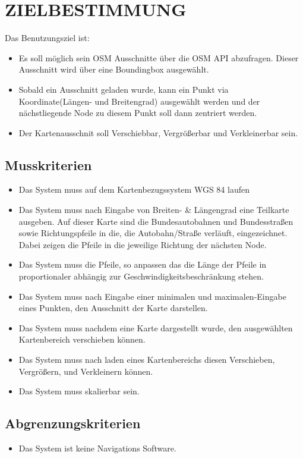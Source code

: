 \newpage
	\section{\Large ZIELBESTIMMUNG}
	Das Benutzungsziel ist:
	\begin{itemize}
		\item Es soll möglich sein OSM Ausschnitte über die OSM API abzufragen. Dieser Ausschnitt wird über eine Boundingbox ausgewählt.
		\item Sobald ein Ausschnitt geladen wurde, kann ein Punkt via Koordinate(Längen- und Breitengrad) ausgewählt werden und der nächstliegende Node zu diesem Punkt soll dann zentriert werden.
		\item Der Kartenausschnit soll Verschiebbar, Vergrößerbar und Verkleinerbar sein.
	\end{itemize}
	\subsection{Musskriterien}
	\begin{itemize}
		\item Das System muss auf dem Kartenbezugssystem WGS 84 laufen
		\item Das System muss nach Eingabe von Breiten- \& Längengrad eine Teilkarte ausgeben. Auf dieser Karte sind die Bundesautobahnen und Bundesstraßen sowie Richtungspfeile in die, die Autobahn/Straße verläuft, eingezeichnet. Dabei zeigen die Pfeile in die jeweilige Richtung der nächsten Node.
		\item Das System muss die Pfeile, so anpassen das die Länge der Pfeile in proportionaler abhängig zur Geschwindigkeitsbeschränkung stehen. 
		\item Das System muss nach Eingabe einer minimalen und maximalen-Eingabe eines Punkten, den Ausschnitt der Karte darstellen.
		\item Das System muss nachdem eine Karte dargestellt wurde, den ausgewählten Kartenbereich verschieben können.
		\item Das System muss nach laden eines Kartenbereichs diesen Verschieben, Vergrößern, und Verkleinern können.
		\item Das System muss skalierbar sein.
	\end{itemize}
	\subsection{Abgrenzungskriterien}
	\begin{itemize}
		\item Das System ist keine Navigations Software.
	\end{itemize}
	
